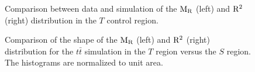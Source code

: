 % 
\begin{figure}[htbp]
\centering
\caption{Comparison between data and simulation of the $\mathrm{M_R}$ (left) and $\mathrm{R^2}$ (right)
distribution in the $T$ control region.
\label{fig:boost_T_region_MR_Rsq}}
\end{figure}
% 
% 
% 
% 
% 

\begin{figure}[htbp]
\centering
\caption{Comparison of the shape of the $\mathrm{M_R}$ (left) and $\mathrm{R^2}$ (right) distribution for the
$t\bar{t}$ simulation in the $T$ region versus the $S$ region. The histograms are normalized to
unit area. 
\label{fig:boost_T_region_shape}}
\end{figure}





